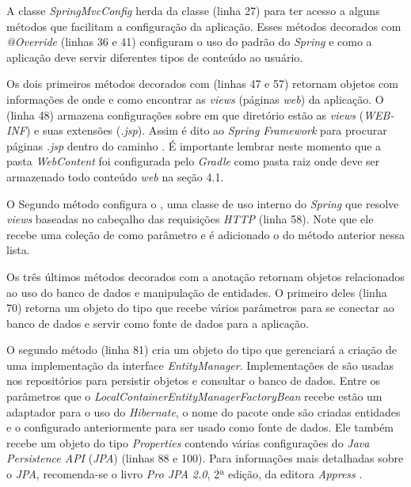 A classe \textit{SpringMvcConfig} herda da classe  (linha 27) para ter acesso a alguns métodos que facilitam a configuração da aplicação. Esses métodos decorados com \textit{@Override} (linhas 36 e 41) configuram o uso do  padrão do \textit{Spring} e como a aplicação deve servir diferentes tipos de conteúdo ao usuário.

Os dois primeiros métodos decorados com  (linhas 47 e 57) retornam objetos com informações de onde e como encontrar as \textit{views} (páginas \textit{web}) da aplicação. O  (linha 48) armazena configurações sobre em que diretório estão as \textit{views} (\textit{WEB-INF}) e suas extensões (\textit{.jsp}). Assim é dito ao \textit{Spring Framework} para procurar páginas \textit{.jsp} dentro do caminho . É importante lembrar neste momento que a pasta \textit{WebContent} foi configurada pelo \textit{Gradle} como pasta raiz onde deve ser armazenado todo conteúdo \textit{web} na seção 4.1. 

O Segundo método configura o , uma classe de uso interno do \textit{Spring} que resolve \textit{views} baseadas no cabeçalho das requisições \textit{HTTP} (linha 58). Note que ele recebe uma coleção de  como parâmetro e é adicionado o  do método anterior nessa lista.

Os três últimos métodos decorados com a anotação  retornam objetos relacionados ao uso do banco de dados e manipulação de entidades. O primeiro deles (linha 70) retorna um objeto do tipo  que recebe vários parâmetros para se conectar ao banco de dados e servir como fonte de dados para a aplicação. 

O segundo método (linha 81) cria um objeto do tipo  que gerenciará a criação de uma implementação da interface \textit{EntityManager}. Implementações de  são usadas nos repositórios para persistir objetos e consultar o banco de dados. Entre os parâmetros que o \textit{LocalContainerEntityManagerFactoryBean} recebe estão um adaptador para o uso do \textit{Hibernate}, o nome do pacote onde são criadas entidades e o  configurado anteriormente para ser usado como fonte de dados. Ele também recebe um objeto do tipo \textit{Properties} contendo várias configurações do \textit{Java Persistence API} (\textit{JPA}) (linhas 88 e 100). Para informações mais detalhadas sobre o \textit{JPA}, recomenda-se o livro \textit{Pro JPA 2.0}, 2ª edição, da editora \textit{Appress} \cite{19}.

